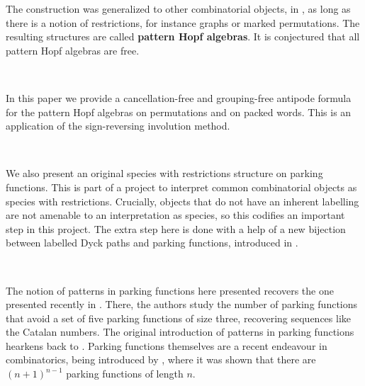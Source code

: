\documentclass[12pt, reqno]{amsart}
\theoremstyle{definition}
\begin{document}
The construction was generalized to other combinatorial objects, in \cite{Penaguiao2020}, as long as there is a notion of restrictions, for instance graphs or marked permutations.
The resulting structures are called \textbf{pattern Hopf algebras}.
It is conjectured that all pattern Hopf algebras are free.

\

In this paper we provide a cancellation-free and grouping-free antipode formula for the pattern Hopf algebras on permutations and on packed words.
This is an application of the sign-reversing involution method.

\

We also present an original species with restrictions structure on parking functions.
This is part of a project to interpret common combinatorial objects as species with restrictions.
Crucially, objects that do not have an inherent labelling are not amenable to an interpretation as species, so this codifies an important step in this project.
The extra step here is done with a help of a new bijection between labelled Dyck paths and parking functions, introduced in \cite{BGLPV2021}.

\

The notion of patterns in parking functions here presented recovers the one presented recently in \cite{adeniran2022pattern}.
There, the authors study the number of parking functions that avoid a set of five parking functions of size three, recovering sequences like the Catalan numbers.
The original introduction of patterns in parking functions hearkens back to \cite{qiu2018patterns}.
Parking functions themselves are a recent endeavour in combinatorics, being introduced by \cite{konheim1966occupancy}, where it was shown that there are $(n+1)^{n-1}$ parking functions of length $n$.

\
\end{document}
